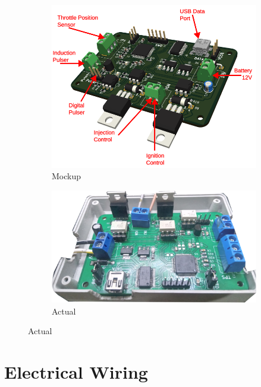 \documentclass[a4paper,12pt,oneside,pdflatex,italian,final,twocolumn]{article}
\begin{document}
	\begin{figure}[h]
		\centering
		\begin{subfigure}{0.45\textwidth}
			\includegraphics[width=\textwidth]{images/ecuparts.png}
			\caption{Mockup}
		\end{subfigure}
		\begin{subfigure}{0.45\textwidth}
			\includegraphics[width=\textwidth]{images/unit.png}
			\caption{Actual}
		\end{subfigure}
	\end{figure}

	\section{Electrical Wiring}
\end{document}
